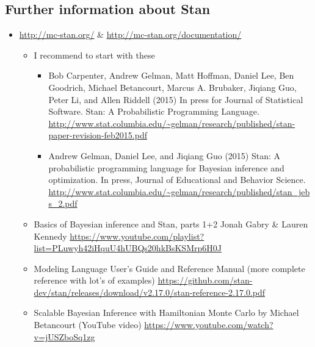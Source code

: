 \documentclass[a4paper,11pt,english]{article}
\begin{document}
\subsection*{Further information about Stan}

\begin{itemize}
\item \url{http://mc-stan.org/} \& \url{http://mc-stan.org/documentation/}
  \begin{itemize}
  \item I recommend to start with these
    \begin{itemize}
    \item Bob Carpenter, Andrew Gelman, Matt Hoffman, Daniel Lee, Ben
      Goodrich, Michael Betancourt, Marcus A. Brubaker, Jiqiang Guo,
      Peter Li, and Allen Riddell (2015) In press for Journal of
      Statistical Software. Stan: A Probabilistic Programming
      Language. \url{http://www.stat.columbia.edu/~gelman/research/published/stan-paper-revision-feb2015.pdf}
    \item Andrew Gelman, Daniel Lee, and Jiqiang Guo (2015) Stan: A
      probabilistic programming language for Bayesian inference and
      optimization. In press, Journal of Educational and Behavior
      Science. \url{http://www.stat.columbia.edu/~gelman/research/published/stan_jebs_2.pdf}
    \end{itemize}
  \item Basics of Bayesian inference and Stan, parts 1+2 Jonah Gabry \& Lauren Kennedy \url{https://www.youtube.com/playlist?list=PLuwyh42iHquU4hUBQs20hkBsKSMrp6H0J}
  \item Modeling Language User's Guide and Reference Manual (more complete reference with lot's of examples) \url{https://github.com/stan-dev/stan/releases/download/v2.17.0/stan-reference-2.17.0.pdf}
  \item Scalable Bayesian Inference with Hamiltonian Monte Carlo by Michael Betancourt (YouTube video) \url{https://www.youtube.com/watch?v=jUSZboSq1zg}
  \end{itemize}
\end{itemize}
\end{document}
